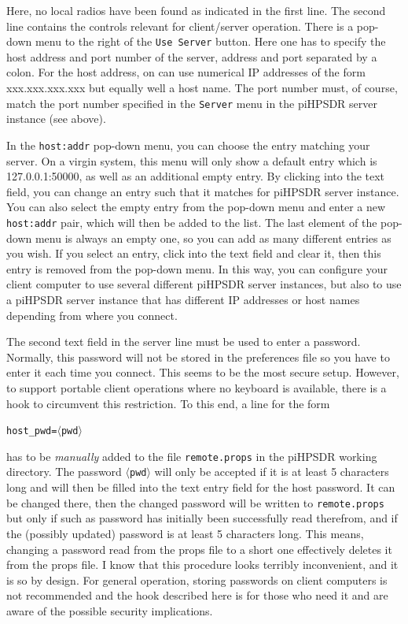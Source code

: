 \documentclass[12pt]{book}
\def\rett#1{\texttt{\color{red}#1}}
\def\bltt#1{\texttt{\color{blue}#1}}
\def\pH{pi\-HPSDR\xspace}
\begin{document}
Here, no local radios have been found as indicated in the first line. The second line contains the controls
relevant for  client/server operation. There is a pop-down menu to the right of the \rett{Use Server} button.
Here one has to specify the host address and port number of the server, address and port separated by a colon.
For the host address, on can use numerical IP addresses of the form xxx.xxx.xxx.xxx but equally well a
host name. The port number must, of course, match the port number specified in the \bltt{Server} menu in
the \pH server instance (see above).

In the \texttt{host:addr} pop-down menu, you can choose the entry matching your server. On a virgin system, this menu
will  only show a default entry which is 127.0.0.1:50000, as well as an additional empty entry.
 By clicking into the text field, you
can change an entry such that it matches for \pH server instance. You can also select the empty entry from
the pop-down menu and enter a new \texttt{host:addr} pair, which will then be added to the list.
 The last element of
the pop-down menu is always an empty one, so you can add as many different entries as you wish. If you select
an entry, click  into the text  field and clear it, then this entry is  removed from the pop-down menu.
In this way, you can configure your client computer to use several different \pH server instances, but also
to use a \pH server instance that has different IP addresses or host names depending from where you connect.

The second text field in the server line must be used to enter a password. Normally, this password will not be
stored in the preferences file so you have to enter it each time you connect. This seems to be the most
secure setup. However, to support portable client operations where no keyboard is available, there is
a hook to circumvent this restriction. To this end, a line for the form

\texttt{host\_pwd=}$\langle$\texttt{pwd}$\rangle$

has to be \textit{manually} added to the file \texttt{remote.props} in the \pH working directory. The
password $\langle$\texttt{pwd}$\rangle$ will only be accepted if it is at least 5 characters long
and will then be filled into the text entry field for the host password. It can be changed there,
then the changed password will be written to \texttt{remote.props} but only if such as password
has initially been successfully read therefrom, and if the (possibly updated) password is at least
5 characters long. This means, changing a password read from the props file to a short one effectively
deletes it from the props file. I know that this procedure looks terribly inconvenient, and it is so
by design. For general operation, storing passwords on client computers is not recommended and the
hook described here is for those who need it and are aware of the possible security implications.
\end{document}
